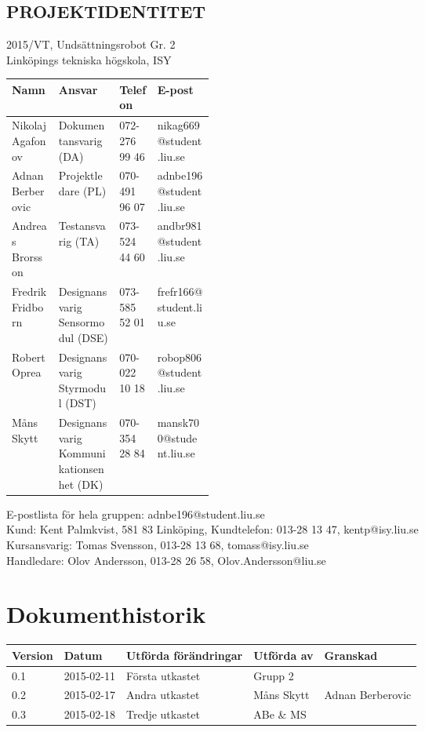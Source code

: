 \documentclass[11pt]{article}
\begin{document}
\pagebreak
\begin{center}

\section*{PROJEKTIDENTITET}
2015/VT, Undsättningsrobot Gr. 2
\\
Linköpings tekniska högskola, ISY
\\[0.5in]
\begin{table}[h]
\begin{tabular}{|l|p{0.3\linewidth}|l|l|} \hline
Namn & Ansvar & Telefon & E-post \\[0.1in] \hline
Nikolaj Agafonov & Dokumentansvarig (DA) & 072-276 99 46 & nikag669@student.liu.se \\ \hline
Adnan Berberovic & Projektledare (PL) & 070-491 96 07 & adnbe196@student.liu.se \\ \hline
Andreas Brorsson & Testansvarig (TA) & 073-524 44 60 & andbr981@student.liu.se \\ \hline
Fredrik Fridborn & Designansvarig Sensormodul (DSE) & 073-585 52 01 & frefr166@student.liu.se \\ \hline
Robert Oprea & Designansvarig Styrmodul (DST) & 070-022 10 18 & robop806@student.liu.se \\ \hline
Måns Skytt & Designansvarig Kommunikationsenhet (DK) & 070-354 28 84 & mansk700@student.liu.se \\ \hline
\end{tabular}
\end{table}

E-postlista för hela gruppen: adnbe196@student.liu.se
\\[1in]
Kund: Kent Palmkvist, 581 83 Linköping,
Kundtelefon: 013-28 13 47, kentp@isy.liu.se
\\[1in]
Kursansvarig: Tomas Svensson, 013-28 13 68, tomass@isy.liu.se
\\
Handledare: Olov Andersson, 013-28 26 58, Olov.Andersson@liu.se
\end{center}
\pagebreak

\tableofcontents

\pagebreak

\section*{Dokumenthistorik}
\begin{table}[h]
\begin{tabular}{|l|l|l|l|l|} \hline

Version & 
Datum & 
Utförda förändringar & 
Utförda av & 
Granskad \\[0.1in] \hline
0.1 &
2015-02-11 & 
Första utkastet & 
Grupp 2 & 
\\ \hline

0.2 &
2015-02-17 & 
Andra utkastet & 
Måns Skytt & 
Adnan Berberovic\\ \hline

0.3 &
2015-02-18 &
Tredje utkastet &
ABe \& MS &
 \\ \hline

\end{tabular}
\end{table}
\end{document}
